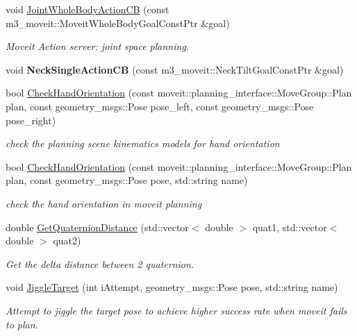 \begin{DoxyCompactItemize}
void \hyperlink{classM3MoveGroup_adcf08e40ebf2191e9d717e2baf275f18}{Joint\+Whole\+Body\+Action\+CB} (const m3\+\_\+moveit\+::\+Moveit\+Whole\+Body\+Goal\+Const\+Ptr \&goal)
\begin{DoxyCompactList}\small\item\em Moveit Action server\+: joint space planning. \end{DoxyCompactList}\item 
\mbox{\label{classM3MoveGroup_aef5fd5bd7565b10b0e5d568bce824773}} 
void {\bfseries Neck\+Single\+Action\+CB} (const m3\+\_\+moveit\+::\+Neck\+Tilt\+Goal\+Const\+Ptr \&goal)
\item 
bool \hyperlink{classM3MoveGroup_a65ac544bc2275fc3823bc66c3a2a7a19}{Check\+Hand\+Orientation} (const moveit\+::planning\+\_\+interface\+::\+Move\+Group\+::\+Plan plan, const geometry\+\_\+msgs\+::\+Pose pose\+\_\+left, const geometry\+\_\+msgs\+::\+Pose pose\+\_\+right)
\begin{DoxyCompactList}\small\item\em check the planning scene kinematics models for hand orientation \end{DoxyCompactList}\item 
bool \hyperlink{classM3MoveGroup_a89b6d3658b6884d6a19a2975193e444a}{Check\+Hand\+Orientation} (const moveit\+::planning\+\_\+interface\+::\+Move\+Group\+::\+Plan plan, const geometry\+\_\+msgs\+::\+Pose pose, std\+::string name)
\begin{DoxyCompactList}\small\item\em check the hand orientation in moveit planning \end{DoxyCompactList}\item 
double \hyperlink{classM3MoveGroup_a000211da0f2ad520583f9efff2401e7a}{Get\+Quaternion\+Distance} (std\+::vector$<$ double $>$ quat1, std\+::vector$<$ double $>$ quat2)
\begin{DoxyCompactList}\small\item\em Get the delta distance between 2 quaternion. \end{DoxyCompactList}\item 
void \hyperlink{classM3MoveGroup_adf12117d8738588cadfa6ab62e008fea}{Jiggle\+Target} (int i\+Attempt, geometry\+\_\+msgs\+::\+Pose pose, std\+::string name)
\begin{DoxyCompactList}\small\item\em Attempt to jiggle the target pose to achieve higher success rate when moveit fails to plan. \end{DoxyCompactList}\item 

\end{DoxyCompactItemize}

